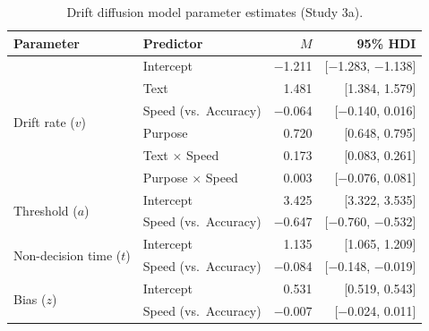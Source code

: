\documentclass[pdflatex,sn-nature]{sn-jnl}
\begin{document}
\begin{appendices}
\begin{table}[htbp]
\caption{Drift diffusion model parameter estimates (Study 3a).}
\label{tab:S10}
\begin{tabular*}{\textwidth}{@{\extracolsep{\fill}}llrr@{}}
\toprule
Parameter & Predictor & $M$ & 95\% HDI \\
\midrule
\multirow{6}{*}{Drift rate ($v$)} & Intercept & $-$1.211 & [$-$1.283, $-$1.138] \\
 & Text                      & 1.481  & [1.384, 1.579]   \\
 & Speed (vs.\ Accuracy)     & $-$0.064 & [$-$0.140, 0.016] \\
 & Purpose                   & 0.720  & [0.648, 0.795]   \\
 & Text $\times$ Speed       & 0.173  & [0.083, 0.261]   \\
 & Purpose $\times$ Speed    & 0.003  & [$-$0.076, 0.081] \\
\midrule
\multirow{2}{*}{Threshold ($a$)} & Intercept & 3.425 & [3.322, 3.535] \\
 & Speed (vs.\ Accuracy)     & $-$0.647 & [$-$0.760, $-$0.532] \\
\midrule
\multirow{2}{*}{Non-decision time ($t$)} & Intercept & 1.135 & [1.065, 1.209] \\
 & Speed (vs.\ Accuracy)     & $-$0.084 & [$-$0.148, $-$0.019] \\
\midrule
\multirow{2}{*}{Bias ($z$)} & Intercept & 0.531 & [0.519, 0.543] \\
 & Speed (vs.\ Accuracy)     & $-$0.007 & [$-$0.024, 0.011] \\
\bottomrule
\end{tabular*}
\end{table}


\end{appendices}
\end{document}
